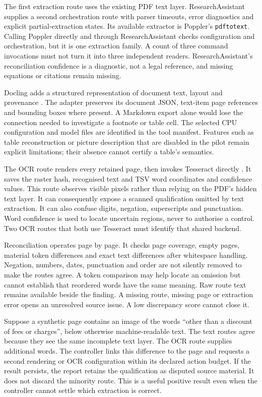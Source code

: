 \documentclass[12pt,a4paper,oneside,openany]{book}
\begin{document}
The first extraction route uses the existing PDF text layer. ResearchAssistant
supplies a second orchestration route with parser timeouts, error diagnostics and
explicit partial-extraction states. Its available extractor is Poppler's
\texttt{pdftotext}. Calling Poppler directly and through ResearchAssistant checks
configuration and orchestration, but it is one extraction family. A count of
three command invocations must not turn it into three independent readers.
ResearchAssistant's reconciliation confidence is a diagnostic, not a legal
reference, and missing equations or citations remain missing.

Docling adds a structured representation of document text, layout and provenance
\citep{doclingsoftware}. The adapter preserves its document JSON, text-item page
references and bounding boxes where present. A Markdown export alone would lose
the connection needed to investigate a footnote or table cell. The selected
CPU configuration and model files are identified in the tool manifest. Features
such as table reconstruction or picture description that are disabled in the
pilot remain explicit limitations; their absence cannot certify a table's
semantics.

The OCR route renders every retained page, then invokes Tesseract directly
\citep{tesseractsoftware}. It saves the raster hash, recognised text and TSV word
coordinates and confidence values. This route observes visible pixels rather
than relying on the PDF's hidden text layer. It can consequently expose a scanned
qualification omitted by text extraction. It can also confuse digits, negation,
superscripts and punctuation. Word confidence is used to locate uncertain
regions, never to authorise a control. Two OCR routes that both use Tesseract
must identify that shared backend.

Reconciliation operates page by page. It checks page coverage, empty pages,
material token differences and exact text differences after whitespace handling.
Negation, numbers, dates, punctuation and order are not silently removed to make
the routes agree. A token comparison may help locate an omission but cannot
establish that reordered words have the same meaning. Raw route text remains
available beside the finding. A missing route, missing page or extraction error
opens an unresolved source issue. A low discrepancy score cannot close it.

Suppose a synthetic page contains an image of the words ``other than a discount
of fees or charges'', below otherwise machine-readable text. The text routes
agree because they see the same incomplete text layer. The OCR route supplies
additional words. The controller links this difference to the page and requests
a second rendering or OCR configuration within its declared action budget. If
the result persists, the report retains the qualification as disputed source
material. It does not discard the minority route. This is a useful positive
result even when the controller cannot settle which extraction is correct.
\end{document}
